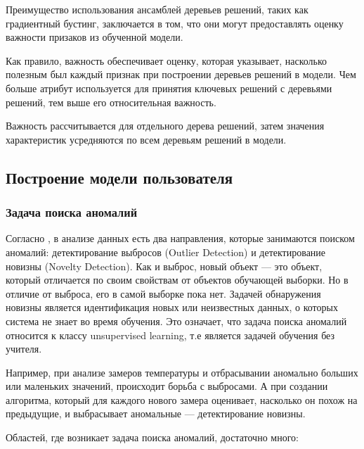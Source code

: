 \documentclass[12pt]{article}
\begin{document}
    \par Преимущество использования ансамблей деревьев решений, таких как градиентный бустинг, заключается в том, что они могут предоставлять оценку важности призаков из обученной модели.

    \par Как правило, важность обеспечивает оценку, которая указывает, насколько полезным был каждый признак при построении деревьев решений в модели. Чем больше атрибут используется для принятия ключевых решений с деревьями решений, тем выше его относительная важность.

    \par Важность рассчитывается для отдельного дерева решений, затем значения характеристик усредняются по всем деревьям решений в модели.


    \subsection{Построение модели пользователя}
    \label{sec:Research:Model}
    
    \subsubsection{Задача поиска аномалий}
    \label{sec:Research:Model:Anomaly}

    \par Согласно \cite{Dyakonov, NoveltyDetection}, в анализе данных есть два направления, которые занимаются поиском аномалий: детектирование выбросов (Outlier Detection) и детектирование новизны (Novelty Detection). Как и выброс, новый объект — это объект, который отличается по своим свойствам от объектов обучающей выборки. Но в отличие от выброса, его в самой выборке пока нет. Задачей обнаружения новизны является идентификация новых или неизвестных данных, о которых система не знает во время обучения. Это означает, что задача поиска аномалий относится к классу unsupervised learning, т.е является задачей обучения без учителя.

    \par Например, при анализе замеров температуры и отбрасывании аномально больших или маленьких значений, происходит борьба с выбросами. А при создании алгоритма, который для каждого нового замера оценивает, насколько он похож на предыдущие, и выбрасывает аномальные — детектирование новизны.

    \par Областей, где возникает задача поиска аномалий, достаточно много:
\end{document}
